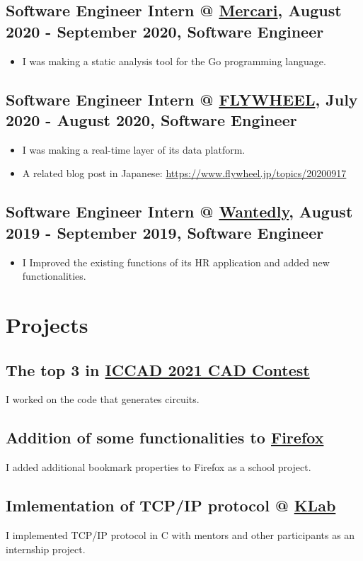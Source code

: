 \documentclass[12pt]{article}
\begin{document}
  \subsection*{Software Engineer Intern @ \href{https://about.mercari.com/en}{Mercari}, August 2020 - September 2020, Software Engineer}
    \begin{itemize}
      \item I was making a static analysis tool for the Go programming language.
    \end{itemize}
  \subsection*{Software Engineer Intern @ \href{https://www.flywheel.jp}{FLYWHEEL}, July 2020 - August 2020, Software Engineer}
    \begin{itemize}
      \item I was making a real-time layer of its data platform.
      \item A related blog post in Japanese: \url{https://www.flywheel.jp/topics/20200917}
    \end{itemize}
  \subsection*{Software Engineer Intern @ \href{https://wantedlyinc.com/ja}{Wantedly}, August 2019 - September 2019, Software Engineer}
    \begin{itemize}
      \item I Improved the existing functions of its HR application and added new functionalities.
    \end{itemize}

\section*{Projects}
  \subsection*{The top 3 in \href{http://iccad-contest.org/2021/}{ICCAD 2021 CAD Contest}}
    I worked on the code that generates circuits.
  \subsection*{Addition of some functionalities to \href{https://slides.com/diohabara/deck}{Firefox}}
    I added additional bookmark properties to Firefox as a school project.
  \subsection*{Imlementation of TCP/IP protocol @ \href{https://www.klab.com/en/}{KLab}}
    I implemented TCP/IP protocol in C with mentors and other participants as an internship project.
\end{document}
